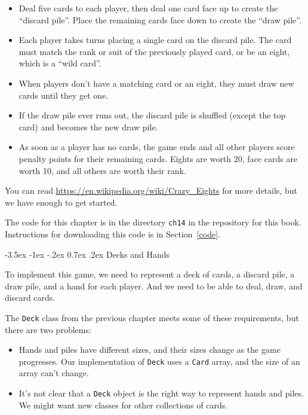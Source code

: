 \documentclass[12pt]{book}
\makeatletter
\theoremstyle{exercise}
\newcommand{\java}[1]{\verb"#1"}
\renewcommand{\section}{\@startsection{section}{1}{\z@}%
    {-3.5ex \@plus -1ex \@minus -.2ex}%
    {0.7ex \@plus.2ex}%
    {\normalfont\Large\bfseries}}
\newcommand{\java}[1]{\lstinline{#1}} %
\makeatother
\begin{document}
\begin{itemize}

\item Deal five cards to each player, then deal one card face up to create the ``discard pile''.
Place the remaining cards face down to create the ``draw pile''.

\item Each player takes turns placing a single card on the discard pile.
The card must match the rank or suit of the previously played card, or be an eight, which is a ``wild card''.

\item When players don't have a matching card or an eight, they must draw new cards until they get one.

\item If the draw pile ever runs out, the discard pile is shuffled (except the top card) and becomes the new draw pile.

\item As soon as a player has no cards, the game ends and all other players score penalty points for their remaining cards.
Eights are worth 20, face cards are worth 10, and all others are worth their rank.

\end{itemize}

You can read \url{https://en.wikipedia.org/wiki/Crazy_Eights} for more details, but we have enough to get started.

The code for this chapter is in the directory {\tt ch14} in the repository for this book.
Instructions for downloading this code is in Section~\ref{code}.


\section{Decks and Hands}

To implement this game, we need to represent a deck of cards, a discard
pile, a draw pile, and a hand for each player.
And we need to be able to deal, draw, and discard cards.

The \java{Deck} class from the previous chapter meets some of these requirements, but there are two problems:

\begin{itemize}

\item Hands and piles have different sizes, and their sizes change as the game progresses.
Our implementation of \java{Deck} uses a \java{Card} array, and the size of an array can't change.

\item It's not clear that a \java{Deck} object is the right way to represent hands and piles.
We might want new classes for other collections of cards.

\end{itemize}
\end{document}
